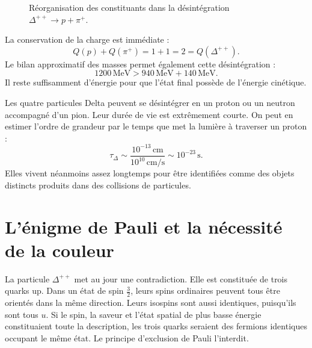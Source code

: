 \begin{figure}[h]
\centering
{}
\caption{Réorganisation des constituants dans la désintégration \(\Delta^{++}\rightarrow p+\pi^+\).}
\end{figure}

La conservation de la charge est immédiate :
\begin{equation}
Q(p)+Q(\pi^+)=1+1=2=Q(\Delta^{++}).
\end{equation}
Le bilan approximatif des masses permet également cette désintégration :
\begin{equation}
1200\,\mathrm{MeV}
>
940\,\mathrm{MeV}+140\,\mathrm{MeV}.
\end{equation}
Il reste suffisamment d’énergie pour que l’état final possède de l’énergie cinétique.

Les quatre particules Delta peuvent se désintégrer en un proton ou un neutron accompagné d’un pion. Leur durée de vie est extrêmement courte. On peut en estimer l’ordre de grandeur par le temps que met la lumière à traverser un proton :
\begin{equation}
\tau_\Delta
\sim
\frac{10^{-13}\,\mathrm{cm}}
     {10^{10}\,\mathrm{cm/s}}
\sim10^{-23}\,\mathrm{s}.
\end{equation}
Elles vivent néanmoins assez longtemps pour être identifiées comme des objets distincts produits dans des collisions de particules.

\begin{classroomqa}
\end{classroomqa}

\section{L’énigme de Pauli et la nécessité de la couleur}

La particule \(\Delta^{++}\) met au jour une contradiction. Elle est constituée de trois quarks up. Dans un état de spin \(\tfrac32\), leurs spins ordinaires peuvent tous être orientés dans la même direction. Leurs isospins sont aussi identiques, puisqu’ils sont tous \(u\). Si le spin, la saveur et l’état spatial de plus basse énergie constituaient toute la description, les trois quarks seraient des fermions identiques occupant le même état. Le principe d’exclusion de Pauli l’interdit.

